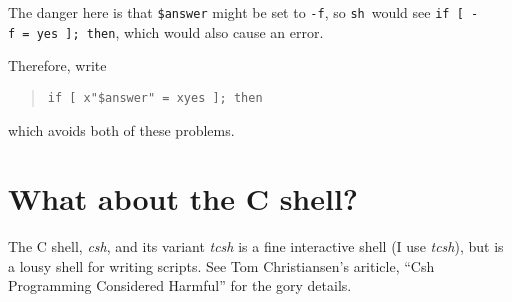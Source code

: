 \documentclass{article}
\newcommand{\fname}[1]{\textsl{#1}}
\newcommand{\code}[1]{\texttt{#1}}
\newcommand{\sh}{\code{sh}}
\begin{document}
	The danger here is that \code{\$answer} might be set to
\code{-f}, so \sh\ would see \code{if~[~-f~=~yes~]; then}, which would
also cause an error.

	Therefore, write
\begin{quote}
\begin{verbatim}
if [ x"$answer" = xyes ]; then
\end{verbatim}%
\end{quote}
which avoids both of these problems.

\section{What about the C shell?}

	The C shell, \fname{csh}, and its variant \fname{tcsh} is a
fine interactive shell (I use \fname{tcsh}), but is a lousy shell for
writing scripts. See Tom Christiansen's ariticle, ``Csh Programming
Considered Harmful'' for the gory details.
\end{document}
